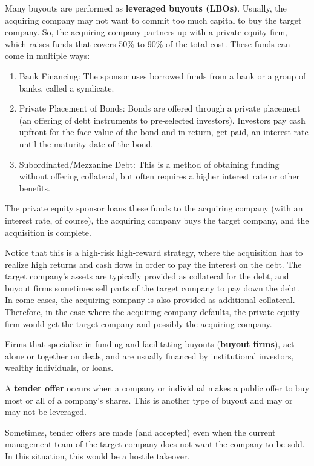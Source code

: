 \documentclass{article}
\begin{document}
    \begin{definition}
      \label{def:leveraged-buyouts}
      Many buyouts are performed as \textbf{leveraged buyouts (LBOs)}. Usually, the acquiring company may not want to commit too much capital to buy the target company. So, the acquiring company partners up with a private equity firm, which raises funds that covers 50\% to 90\% of the total cost. These funds can come in multiple ways: 
      \begin{enumerate}
        \item Bank Financing: The sponsor uses borrowed funds from a bank or a group of banks, called a syndicate. 
        \item Private Placement of Bonds: Bonds are offered through a private placement (an offering of debt instruments to pre-selected investors). Investors pay cash upfront for the face value of the bond and in return, get paid, an interest rate until the maturity date of the bond. 
        \item Subordinated/Mezzanine Debt: This is a method of obtaining funding without offering collateral, but often requires a higher interest rate or other benefits. 
      \end{enumerate}
      The private equity sponsor loans these funds to the acquiring company (with an interest rate, of course), the acquiring company buys the target company, and the acquisition is complete. 

      Notice that this is a high-risk high-reward strategy, where the acquisition has to realize high returns and cash flows in order to pay the interest on the debt. The target company's assets are typically provided as collateral for the debt, and buyout firms sometimes sell parts of the target company to pay down the debt. In come cases, the acquiring company is also provided as additional collateral. Therefore, in the case where the acquiring company defaults, the private equity firm would get the target company and possibly the acquiring company. 

      Firms that specialize in funding and facilitating buyouts (\textbf{buyout firms}), act alone or together on deals, and are usually financed by institutional investors, wealthy individuals, or loans. 
    \end{definition}

    \begin{definition}
      \label{def:tender-offer}
      A \textbf{tender offer} occurs when a company or individual makes a public offer to buy most or all of a company's shares. This is another type of buyout and may or may not be leveraged. 

      Sometimes, tender offers are made (and accepted) even when the current management team of the target company does not want the company to be sold. In this situation, this would be a hostile takeover. 
    \end{definition}
\end{document}
